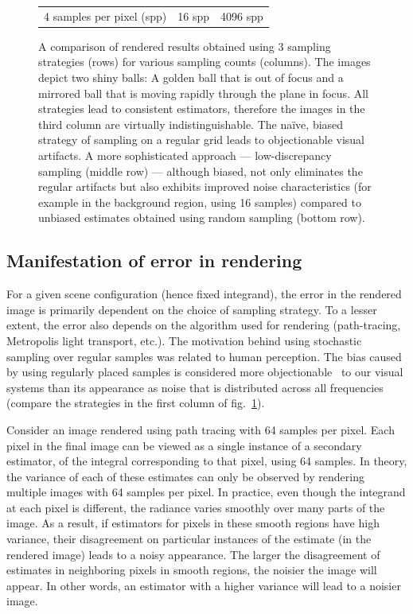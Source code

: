 \begin{figure}
\begin{tabular}{c c c}
   4 samples per pixel (spp)& 16 spp& 4096 spp \\
\end{tabular} 
\label{fig:errorrender}
\caption{A comparison of rendered results obtained using 3 sampling strategies (rows) for various sampling counts (columns). The images depict two shiny balls: A golden ball that is out of focus and a mirrored ball  that is moving rapidly through the plane in focus. All strategies lead to consistent estimators, therefore the images in the third column are virtually indistinguishable. The na\"ive, biased strategy of sampling on a regular grid leads to objectionable visual artifacts. A more sophisticated approach --- low-discrepancy sampling (middle row) --- although biased, not only eliminates the regular artifacts but also exhibits improved noise characteristics (for example in the background region, using 16 samples) compared to unbiased estimates obtained using random sampling (bottom row). }
\end{figure}

\subsection{Manifestation of error in rendering}
For a given scene configuration (hence fixed integrand), the error in the rendered image is primarily dependent on the choice of sampling strategy. To a lesser extent, the error also depends on the algorithm used for rendering (path-tracing, Metropolis light transport, etc.). The motivation behind using stochastic sampling over regular samples was related to human perception. The bias caused by using regularly placed samples is considered more objectionable~\cite{Wold85,Cook:1986:SSC} to our visual systems than its appearance as noise that is distributed across all frequencies (compare the strategies in the first column of fig.~\ref{fig:errorrender}). 

Consider an image rendered using path tracing with 64 samples per pixel. Each pixel in the final image can be viewed as a single instance of a secondary estimator, of the integral corresponding to that pixel, using 64 samples. In theory, the variance of each of these estimates can only be observed by rendering multiple images with 64 samples per pixel. In practice, even though the integrand at each pixel is different, the radiance varies smoothly over many parts of the image. As a result, if estimators for pixels in these smooth regions have high variance, their disagreement on particular instances of the estimate (in the rendered image) leads to a noisy appearance. The larger the disagreement of estimates in neighboring pixels in smooth regions, the noisier the image will appear. In other words, an estimator with a higher variance will lead to a noisier image.

